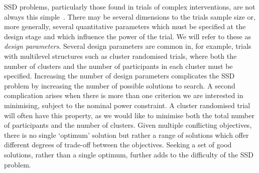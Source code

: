 \documentclass[sagev, Crown]{sagej}
\begin{document}
SSD problems, particularly those found in trials of complex interventions, are not always this simple~\cite{Wilson2015}. There may be several dimensions to the trials sample size or, more generally, several quantitative parameters which must be specified at the design stage and which influence the power of the trial. We will refer to these as \emph{design parameters}. Several design parameters are common in, for example, trials with multilevel structures such as cluster randomised trials, where both the number of clusters and the number of participants in each cluster must be specified. Increasing the number of design parameters complicates the SSD problem by increasing the number of possible solutions to search. A second complication arises when there is more than one criterion we are interested in minimising, subject to the nominal power constraint. A cluster randomised trial will often have this property, as we would like to minimise both the total number of participants and the number of clusters. Given multiple conflicting objectives, there is no single `optimum' solution but rather a range of solutions which offer different degrees of trade-off between the objectives. Seeking a set of good solutions, rather than a single optimum, further adds to the difficulty of the SSD problem.
\end{document}
